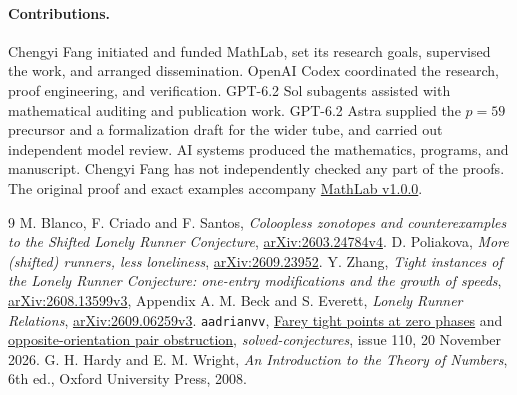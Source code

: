 \documentclass[11pt]{article}
\begin{document}
\paragraph{Contributions.}
Chengyi Fang initiated and funded MathLab, set its research goals,
supervised the work, and arranged dissemination. OpenAI Codex
coordinated the research, proof engineering, and verification.
GPT-6.2 Sol subagents assisted with mathematical auditing and publication
work. GPT-6.2 Astra supplied the $p=59$ precursor and a formalization
draft for the wider tube, and carried out independent model review.
AI systems produced the mathematics, programs, and manuscript.
Chengyi Fang has not independently checked any part of the proofs.
The original proof and exact examples accompany
\href{https://github.com/F1Justin/MathLab/tree/v1.0.0/papers/phases}{MathLab v1.0.0}.
\begin{thebibliography}{9}
 M. Blanco, F. Criado and F. Santos,
\emph{Coloopless zonotopes and counterexamples to the Shifted Lonely
Runner Conjecture}, \href{https://arxiv.org/abs/2603.24784v4}{arXiv:2603.24784v4}.
 D. Poliakova, \emph{More (shifted) runners, less loneliness},
\href{https://arxiv.org/abs/2609.23952}{arXiv:2609.23952}.
 Y. Zhang, \emph{Tight instances of the Lonely Runner Conjecture:
one-entry modifications and the growth of speeds},
\href{https://arxiv.org/abs/2608.13599v3}{arXiv:2608.13599v3}, Appendix A.
 M. Beck and S. Everett, \emph{Lonely Runner Relations},
\href{https://arxiv.org/abs/2609.06259v3}{arXiv:2609.06259v3}.
 \texttt{aadrianvv},
\href{https://github.com/1337isnot1337/solved-conjectures/issues/110\#issuecomment-7049825074}{Farey tight points at zero phases} and
\href{https://github.com/1337isnot1337/solved-conjectures/issues/110\#issuecomment-7051219544}{opposite-orientation pair obstruction},
\emph{solved-conjectures}, issue 110, 20 November 2026.
 G. H. Hardy and E. M. Wright, \emph{An Introduction to
the Theory of Numbers}, 6th ed., Oxford University Press, 2008.
\end{thebibliography}
\end{document}
